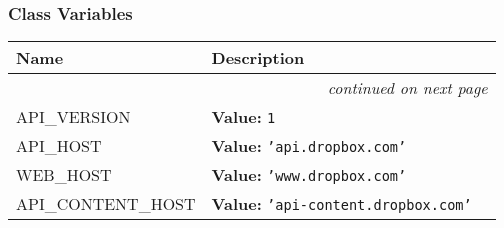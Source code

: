 
  \subsubsection{Class Variables}

    \vspace{-1cm}
\hspace{\varindent}\begin{longtable}{|p{\varnamewidth}|p{\vardescrwidth}|l}
\cline{1-2}
\cline{1-2} \centering \textbf{Name} & \centering \textbf{Description}& \\
\cline{1-2}
\endhead\cline{1-2}\multicolumn{3}{r}{\small\textit{continued on next page}}\\\endfoot\cline{1-2}
\endlastfoot\raggedright A\-P\-I\-\_\-V\-E\-R\-S\-I\-O\-N\- & \raggedright \textbf{Value:} 
{\tt 1}&\\
\cline{1-2}
\raggedright A\-P\-I\-\_\-H\-O\-S\-T\- & \raggedright \textbf{Value:} 
{\tt \texttt{'}\texttt{api.dropbox.com}\texttt{'}}&\\
\cline{1-2}
\raggedright W\-E\-B\-\_\-H\-O\-S\-T\- & \raggedright \textbf{Value:} 
{\tt \texttt{'}\texttt{www.dropbox.com}\texttt{'}}&\\
\cline{1-2}
\raggedright A\-P\-I\-\_\-C\-O\-N\-T\-E\-N\-T\-\_\-H\-O\-S\-T\- & \raggedright \textbf{Value:} 
{\tt \texttt{'}\texttt{api-content.dropbox.com}\texttt{'}}&\\
\cline{1-2}
\end{longtable}

